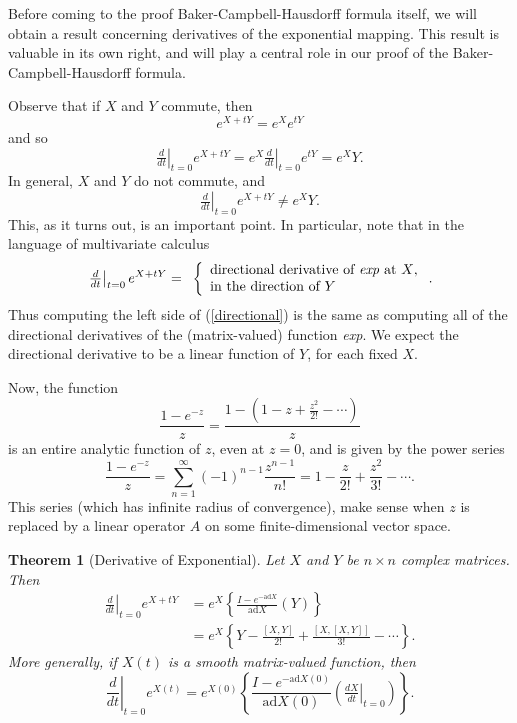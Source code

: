 \documentclass{amsbook}
\theoremstyle{plain}
\newtheorem{theorem}{Theorem}
\numberwithin{equation}{chapter}
\numberwithin{theorem}{chapter}
\begin{document}
Before coming to the proof Baker-Campbell-Hausdorff formula itself, we will
obtain a result concerning derivatives of the exponential mapping. This result
is valuable in its own right, and will play a central role in our proof of the
Baker-Campbell-Hausdorff formula.

Observe that if $X$ and $Y$ commute, then
\[
e^{X+tY}=e^{X}e^{tY}%
\]
and so
\[
\left.  \tfrac d{dt}\right|  _{t=0}e^{X+tY}=e^{X}\left.  \tfrac d{dt}\right|
_{t=0}e^{tY}=e^{X}Y\text{.}%
\]
In general, $X$ and $Y$ do not commute, and
\[
\left.  \tfrac d{dt}\right|  _{t=0}e^{X+tY}\neq e^{X}Y\text{.}%
\]
This, as it turns out, is an important point. In particular, note that in the
language of multivariate calculus
\begin{equation}
\left.  \tfrac d{dt}\right|  _{t=0}e^{X+tY}=\text{ }\left\{
\begin{array}
[c]{l}%
\text{directional derivative of \textit{exp} at }X\text{,}\\
\text{in the direction of }Y
\end{array}
\right.  \text{.}\label{directional}%
\end{equation}
Thus computing the left side of (\ref{directional}) is the same as computing
all of the directional derivatives of the (matrix-valued) function
\textit{exp}. We expect the directional derivative to be a linear function of
$Y$, for each fixed $X$.

Now, the function
\[
\frac{1-e^{-z}}{z}=\frac{1-(1-z+\frac{z^{2}}{2!}-\cdots)}{z}%
\]
is an entire analytic function of $z$, even at $z=0$, and is given by the
power series
\[
\frac{1-e^{-z}}{z}=\sum_{n=1}^{\infty}(-1)^{n-1}\frac{z^{n-1}}{n!}=1-\frac
{z}{2!}+\frac{z^{2}}{3!}-\cdots\text{.}%
\]
This series (which has infinite radius of convergence), make sense when $z$ is
replaced by a linear operator $A$ on some finite-dimensional vector space.

\begin{theorem}
[Derivative of Exponential]\label{exp.derivative}Let $X$ and $Y$ be $n\times
n$ complex matrices. Then
\begin{align}
\left.  \frac{d}{dt}\right|  _{t=0}e^{X+tY}  & =e^{X}\left\{  \frac
{I-e^{-\mathrm{ad}X}}{\mathrm{ad}X}(Y)\right\}  \nonumber\\
& =e^{X}\left\{  Y-\frac{[X,Y]}{2!}+\frac{[X,[X,Y]]}{3!}-\cdots\right\}
\text{.}\label{derivative.a}%
\end{align}
More generally, if $X\left(  t\right)  $ is a smooth matrix-valued function,
then
\begin{equation}
\left.  \frac{d}{dt}\right|  _{t=0}e^{X(t)}=e^{X(0)}\left\{  \frac
{I-e^{-\mathrm{ad}X(0)}}{\mathrm{ad}X(0)}\left(  \left.  \tfrac{dX}%
{dt}\right|  _{t=0}\right)  \right\}  \text{.}\label{derivative2}%
\end{equation}
\end{theorem}
\end{document}
